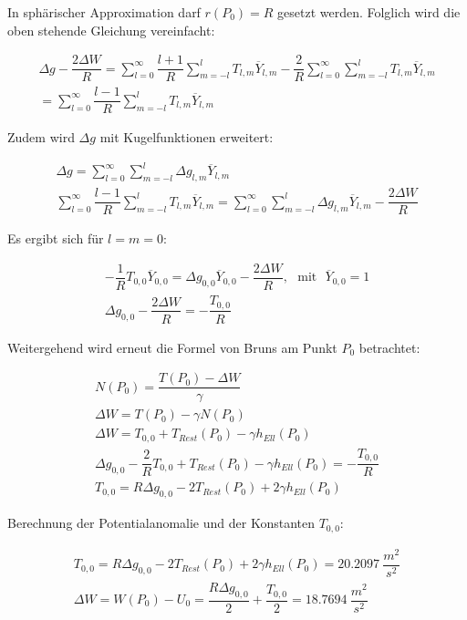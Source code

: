 \begin{enumerate}[a)]
In sphärischer Approximation darf $r(P_0)=R$ gesetzt werden. Folglich wird die oben stehende Gleichung vereinfacht: 

\begin{gather*}
\Delta g - \dfrac{2 \Delta W}{R} = \sum_{l=0}^{\infty} \dfrac{l+1}{R} \sum_{m=-l}^{l} T_{l,m} \overline{Y}_{l,m} - \dfrac{2}{R} \sum_{l=0}^{\infty} \sum_{m=-l}^{l} T_{l,m} \overline{Y}_{l,m} \\
= \sum_{l=0}^{\infty} \dfrac{l-1}{R} \sum_{m=-l}^{l} T_{l,m} \overline{Y}_{l,m}
\end{gather*}

Zudem wird $\Delta g$ mit Kugelfunktionen erweitert: 

\begin{gather*}
\Delta g = \sum_{l=0}^{\infty} \sum_{m=-l}^{l} \Delta g_{l,m} \overline{Y}_{l,m} \\
\sum_{l=0}^{\infty} \dfrac{l-1}{R} \sum_{m=-l}^{l} T_{l,m} \overline{Y}_{l,m} = \sum_{l=0}^{\infty} \sum_{m=-l}^{l} \Delta g_{l,m} \overline{Y}_{l,m} - \dfrac{2 \Delta W}{R}
\end{gather*}

Es ergibt sich für $l=m=0$: 

\begin{gather*}
- \dfrac{1}{R} T_{0,0} \overline{Y}_{0,0} = \Delta g_{0,0} \overline{Y}_{0,0} - \dfrac{2 \Delta W}{R}, ~~~ \text{mit} ~~~ \overline{Y}_{0,0} = 1 \\
\Delta g_{0,0} - \dfrac{2 \Delta W}{R} = - \dfrac{T_{0,0}}{R} 
\end{gather*}

Weitergehend wird erneut die Formel von Bruns am Punkt $P_0$ betrachtet: 

\begin{gather*}
N(P_0) = \dfrac{T(P_0) - \Delta W}{\gamma} \\
\Delta W = T(P_0) - \gamma N(P_0) \\ 
\Delta W = T_{0,0} + T_{Rest}(P_0) - \gamma h_{Ell}(P_0) \\
\Delta g_{0,0} - \dfrac{2}{R} T_{0,0} + T_{Rest}(P_0) - \gamma h_{Ell}(P_0) = - \dfrac{T_{0,0}}{R} \\
T_{0,0} = R \Delta g_{0,0} - 2 T_{Rest}(P_0) + 2 \gamma h_{Ell}(P_0)
\end{gather*}

Berechnung der Potentialanomalie und der Konstanten $T_{0,0}$: 

\begin{gather*}
T_{0,0} = R \Delta g_{0,0} - 2 T_{Rest}(P_0) + 2 \gamma h_{Ell}(P_0) = 20.2097~\dfrac{m^2}{s^2} \\
\Delta W = W(P_0) - U_0 = \dfrac{R \Delta g_{0,0}}{2} + \dfrac{T_{0,0}}{2} = 18.7694~\dfrac{m^2}{s^2}
\end{gather*}


\end{enumerate}
